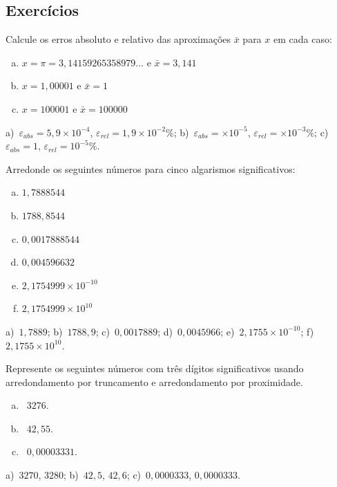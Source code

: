 \subsection*{Exercícios}

\begin{exer} Calcule os erros absoluto e relativo das aproximações $\bar{x}$ para $x$ em cada caso:
  \begin{enumerate}[a)]
  \item $x=\pi=3,14159265358979\ldots$ e $\bar{x}=3,141$
  \item $x=1,00001$ e $\bar{x}=1$
  \item $x=100001$ e $\bar{x}=100000$
  \end{enumerate}
\end{exer}
\begin{resp}
  a)~$\varepsilon_{abs} = 5,9\times 10^{-4}$, $\varepsilon_{rel} = 1,9\times 10^{-2}\%$; b)~$\varepsilon_{abs} = \times 10^{-5}$, $\varepsilon_{rel} = \times 10^{-3}\%$; c)~$\varepsilon_{abs} = 1$, $\varepsilon_{rel} = 10^{-5}\%$.
\end{resp}


\begin{exer} Arredonde os seguintes números para cinco algarismos significativos:
    \begin{enumerate}[a)]
    \item $1,7888544$
    \item $1788,8544$
    \item $0,0017888544$
    \item $0,004596632$
    \item $ 2,1754999\times 10^{-10}$
    \item $ 2,1754999\times 10^{10}$
    \end{enumerate}
\end{exer}
\begin{resp}
a)~$1,7889$; b)~$1788,9$; c)~$0,0017889$; d)~$0,0045966$; e)~$2,1755\times 10^{-10}$; f)~$2,1755\times 10^{10}$.
\end{resp}

\begin{exer}  Represente os seguintes números com três dígitos significativos usando arredondamento por truncamento e arredondamento por proximidade.
  \begin{enumerate}[a)]
  \item~$3276$.
  \item~$42,55$.
  \item~$0,00003331$.
  \end{enumerate}
\end{exer}
\begin{resp}
  a)~$3270$, $3280$; b)~$42,5$, $42,6$; c)~$0,0000333$, $0,0000333$.
\end{resp}

